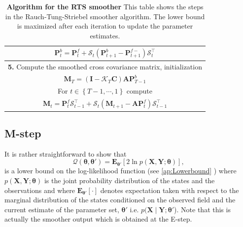 \documentclass[review,authoryear,3p]{elsarticle}
\begin{document}
\begin{table}[!ht]
\begin{tabular}{|c|}
 $\mathbf P_{t}^{b}=\mathbf P_{t}^{f}+\mathcal S_t(\mathbf P_{t+1}^{b}-\mathbf P_{t+1}^{f-})\mathcal S_t^\top$\\  
\hline
\multicolumn{1}{|p{16cm}|}{\textbf{5.} Compute the smoothed cross covariance matrix, initialization}\\
$\mathbf M_T=(\mathbf I-\mathcal K_T\mathbf C)\mathbf A\mathbf P_{T-1}^b$\\
\multicolumn{1}{|p{16cm}|}{For $t\in\left\lbrace T-1,\cdots,1\right\rbrace $ compute}\\
$\mathbf M_t= \mathbf P_t^{f}\mathcal S_{t-1}^{\top}+\mathcal S_{t}(\mathbf M_{t+1}-\mathbf A\mathbf P_t^{f} )\mathcal S_{t-1}^{\top}$\\
\hline
\end{tabular}
\caption{\textbf{Algorithm for the RTS smoother} This table shows the steps in the  Rauch-Tung-Striebel smoother algorithm. The lower bound is maximized after each iteration to update the parameter estimates.}
\label{alg:MRA-RTS}
\end{table}
\renewcommand{\arraystretch}{1}
 \subsection{M-step}
It is rather straightforward to show that 
\begin{equation}
	\mathcal Q(\boldsymbol \theta,\boldsymbol\theta')= \mathbf E_{\boldsymbol \theta'}\left[2\ln p(\mathbf X,\mathbf Y;\boldsymbol \theta)\right], 
\end{equation}
is a lower bound on the log-likelihood function \cite{Bishop2006} (see \ref{ap:Lowerbound} )  where $p(\mathbf X,\mathbf Y;\boldsymbol \theta)$ is the joint probability distribution of the states and the observations and where $ \mathbf E_{\boldsymbol \theta'}\left[\cdot\right] $ denotes expectation taken with respect to the marginal distribution of the states conditioned on the observed field and the current estimate of the parameter set, $\boldsymbol\theta'$ i.e.  $p(\mathbf X\mid\mathbf Y;\boldsymbol \theta'$). Note that this is actually the smoother output which is obtained at the E-step.
\end{document}
